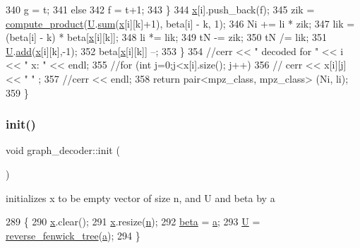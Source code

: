 \begin{DoxyCode}
340         g = t;
341       \textcolor{keywordflow}{else}
342         f = t+1;
343     \}
344     \hyperlink{classgraph__decoder_aa3f2776afe387668cf7f68109428e14e}{x}[i].push\_back(f);
345     zik = \hyperlink{compression__helper_8cpp_ae2afb43aabe50f7d42aae8f82b5a35f4}{compute\_product}(\hyperlink{classgraph__decoder_a2fa9fec2cef06aaa410e57fb59d5c1ad}{U}.\hyperlink{classreverse__fenwick__tree_a672731fd6395b4853430073a099a80e6}{sum}(\hyperlink{classgraph__decoder_aa3f2776afe387668cf7f68109428e14e}{x}[i][k]+1), beta[i] - k, 1);
346     Ni += li * zik;
347     lik = (beta[i] - k) * beta[\hyperlink{classgraph__decoder_aa3f2776afe387668cf7f68109428e14e}{x}[i][k]];
348     li *= lik;
349     tN -= zik;
350     tN /= lik;
351     \hyperlink{classgraph__decoder_a2fa9fec2cef06aaa410e57fb59d5c1ad}{U}.\hyperlink{classreverse__fenwick__tree_a942d7f49b37e53ebfec3076d177691d7}{add}(\hyperlink{classgraph__decoder_aa3f2776afe387668cf7f68109428e14e}{x}[i][k],-1);
352     beta[\hyperlink{classgraph__decoder_aa3f2776afe387668cf7f68109428e14e}{x}[i][k]] --;
353   \}
354   \textcolor{comment}{//cerr << " decoded for " << i << " x: " << endl;}
355   \textcolor{comment}{//for (int j=0;j<x[i].size(); j++)}
356   \textcolor{comment}{//  cerr << x[i][j] << " " ;}
357   \textcolor{comment}{//cerr << endl;}
358   \textcolor{keywordflow}{return} pair<mpz\_class, mpz\_class> (Ni, li);
359 \}
\end{DoxyCode}
\mbox{\label{classgraph__decoder_a97a9dcd5af21ece86fa91adcb41ca9cc}} 
\subsubsection{\texorpdfstring{init()}{init()}}
{\footnotesize\ttfamily void graph\+\_\+decoder\+::init (\begin{DoxyParamCaption}{ }\end{DoxyParamCaption})}



initializes x to be empty vector of size n, and U and beta by a 


\begin{DoxyCode}
289 \{
290   \hyperlink{classgraph__decoder_aa3f2776afe387668cf7f68109428e14e}{x}.clear();
291   \hyperlink{classgraph__decoder_aa3f2776afe387668cf7f68109428e14e}{x}.resize(\hyperlink{classgraph__decoder_a6bc1e72b2f7a913d14b789a6c2d92c1e}{n});
292   \hyperlink{classgraph__decoder_aa57c11e4c09c52101682ff83286162f7}{beta} = \hyperlink{classgraph__decoder_a9dd7c3c11b8a45a12cb7c3c2d2bfa2cc}{a};
293   \hyperlink{classgraph__decoder_a2fa9fec2cef06aaa410e57fb59d5c1ad}{U} = \hyperlink{classreverse__fenwick__tree}{reverse\_fenwick\_tree}(\hyperlink{classgraph__decoder_a9dd7c3c11b8a45a12cb7c3c2d2bfa2cc}{a});
294 \}
\end{DoxyCode}


